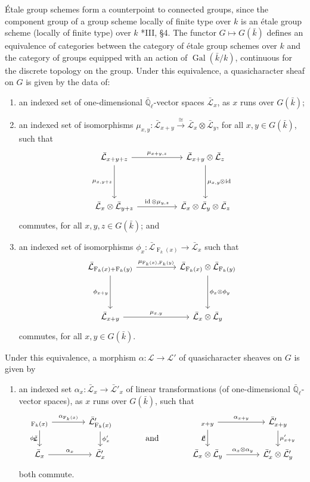 \documentclass[11pt]{amsart}
\makeatletter
\theoremstyle{plain}
\theoremstyle{definition}
\theoremstyle{remark}
\newcommand{\EE}{\mathbb{\bar Q}_\ell}
\newcommand{\bFq}{\bar{k}}
\newcommand{\Fq}{k}
\DeclareMathOperator{\Gal}{Gal}
\newcommand{\Frob}[1]{\operatorname{F}_{#1}}
\DeclareMathOperator{\id}{id}
\newcommand{\iso}{{\ \cong\ }}
\newcommand{\cs}[1]{{\mathcal{#1}}}
\newcommand{\gcs}[1]{{\mathcal{\bar #1}}}
\newcommand{\labitem}[2]{%
\def\@itemlabel{\textbf{#1}}
\item
\def\@currentlabel{#1}\label{#2}}
\newcommand{\tight}[3]{\hspace{-#1pt}{#2}\hspace{-#3pt}}
\makeatother
\begin{document}
\'Etale group schemes form a counterpoint to connected groups, since the component group of a group scheme locally of finite type over $\Fq$ is an \'etale group scheme (locally of finite type) over $\Fq$ \cite{vdGeer-Moonen:AbelianVarieties}*{III, \S 4}.  The functor $G \mapsto G(\bFq)$ defines an equivalence of categories
between the category of \'etale group schemes over $\Fq$ and the category of groups equipped
with an action of $\Gal(\bFq/\Fq)$, continuous for the discrete topology on the group.
Under this equivalence, a quasicharacter sheaf on $G$ is given by the data of:
\begin{enumerate}
 \labitem{(cs.0)}{cs.0} an indexed set of one-dimensional
  $\EE$-vector spaces $\gcs{L}_x$, as $x$ runs over
  $G(\bFq)$;

 \labitem{(cs.1)}{cs.1} an indexed set of isomorphisms
  $\mu_{x,y} : \gcs{L}_{x+y} \mathop{\longrightarrow}\limits^{\iso} \gcs{L}_{x} \otimes \gcs{L}_{y}$,
  for all $x,y \in G(\bFq)$, such that
  \[
   \begin{tikzcd}[row sep=40]
    \gcs{L}_{x+y+z} \arrow{rr}{\mu_{x+y,z}} \arrow[swap]{d}{\mu_{x,y+z}}
    && \gcs{L}_{x+y}\otimes \gcs{L}_{z} \dar{\mu_{x,y} \tight{0.5}{\otimes}{1} \id} \\
    \gcs{L}_{x} \otimes \gcs{L}_{y+z} \arrow{rr}{\id \otimes \mu_{y,z}}
    && \gcs{L}_{x} \otimes\gcs{L}_{y} \otimes \gcs{L}_{z}
   \end{tikzcd}
  \]
  commutes, for all $x,y,z\in G(\bFq)$; and

 \labitem{(cs.2)}{cs.2} an indexed set of isomorphisms $\phi_{x} : \gcs{L}_{\Frob{\Fq}(x)} \to \gcs{L}_x$
  such that
  \[
   \begin{tikzcd}[row sep=40]
    \gcs{L}_{\Frob{\Fq}(x)+\Frob{\Fq}(y)} \arrow[swap]{d}{\phi_{x+y}} \arrow{rr}{\mu_{\Frob{\Fq}(x),\Frob{\Fq}(y)}}
    && \gcs{L}_{\Frob{\Fq}(x)}\otimes \gcs{L}_{\Frob{\Fq}(y)} \dar{\phi_x \tight{0}{\otimes}{0} \phi_y} \\
    \gcs{L}_{x+y} \arrow{rr}{\mu_{x,y}}
    && \gcs{L}_x \otimes\gcs{L}_y
   \end{tikzcd}
  \]
  commutes, for all $x,y\in G(\bFq)$.
\end{enumerate}
Under this equivalence, a morphism $\alpha : \cs{L} \to \cs{L'}$ of quasicharacter sheaves on $G$ is given by 
\begin{enumerate}
 \labitem{(cs.3)}{cs.3} an indexed set $\alpha_x : \gcs{L}_x \to \gcs{L'}_x$
  of linear transformations (of one-dimensional $\EE$-vector spaces),
  as $x$ runs over $G(\bFq)$, such that
  \[
   \begin{tikzcd}[column sep=40]
    \arrow[swap]{d}{\phi_x} \gcs{L}_{\Frob{\Fq}(x)} \rar{\alpha_{\Frob{\Fq}(x)}} & \gcs{L'}_{\Frob{\Fq}(x)} \dar{\phi_x'}
    &\arrow[draw=none]{d}[pos=.4,description]{\text{\normalsize{and}}}& \arrow[swap]{d}{\mu} \gcs{L}_{x+y} \rar{\alpha_{x+y}} & \gcs{L'}_{x+y} \dar{\mu'_{x+y}} \\
    \gcs{L}_x \rar{\alpha_x} & \gcs{L'}_x
    & {} & \gcs{L}_x\otimes\gcs{L}_y \rar{\alpha_x\otimes \alpha_y} & \gcs{L'}_x \otimes \gcs{L'}_y
   \end{tikzcd}
  \]
  both commute.
\end{enumerate}
\end{document}
